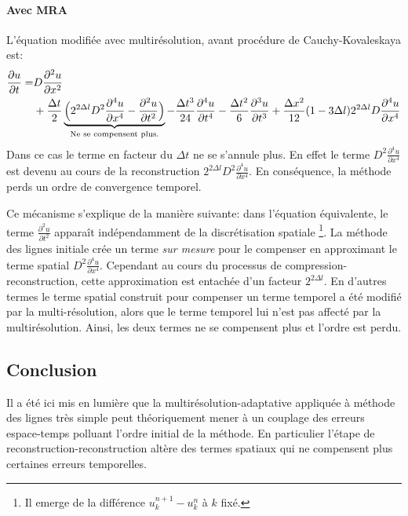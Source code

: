     \paragraph{Avec MRA}
        L'équation modifiée avec multirésolution, avant procédure de Cauchy-Kovaleskaya est:
        \begin{align}
            \frac{\partial u}{\partial  t} =&D \frac{\partial^{2} u}{\partial x^{2}}\\\notag
            &+ \frac{\Delta t}{2} \underbrace{\Bigl(2^{2 \Delta l} D^{2}           \frac{\partial^{4} u}{\partial x^{4}} -\frac{\partial^{2} u}{\partial t^{2}} \Bigr)}_{\text{Ne se compensent plus.}}
            -\frac{\Delta t^{3}}{24}                          \frac{\partial^{4} u}{\partial t^{4}} 
            - \frac{\Delta t^{2}}{6}                           \frac{\partial^{3} u}{\partial t^{3}}
            +\frac{\Delta x^{2}}{12} (1 - 3\Delta l)    2^{2 \Delta l} D \frac{\partial^{4} u}{\partial x^{4}}
        \end{align}
        Dans ce cas le terme en facteur du $\Delta t$ ne se s'annule plus. En effet le terme $D^{2}\frac{\partial^{4} u}{\partial x^{4}}$ est devenu au cours de la reconstruction
        $2^{2 \Delta l} D^{2}\frac{\partial^{4} u}{\partial x^{4}}$. En conséquence, la méthode perds un ordre de convergence temporel.\par
        Ce mécanisme s'explique de la manière suivante: dans l'équation équivalente, le terme $\frac{\partial^{2} u}{\partial t^{2}}$ apparaît indépendamment de la discrétisation spatiale
        \footnote{Il emerge de la différence $u_k^{n+1} - u_k^{n}$ à $k$ fixé.}. La méthode des lignes initiale crée un terme \textit{sur mesure} pour le compenser en approximant le terme spatial
        $D^{2}\frac{\partial^{4} u}{\partial x^{4}}$. Cependant au cours du processus de compression-reconstruction, cette approximation est entachée d'un facteur $2^{2 \Delta l}$.
        En d'autres termes le terme spatial construit pour compenser un terme temporel a été modifié par la multi-résolution, alors que le terme temporel lui n'est pas affecté par la multirésolution.
        Ainsi, les deux termes ne se compensent plus et l'ordre est perdu.
\subsection{Conclusion}
    Il a été ici mis en lumière que la multirésolution-adaptative appliquée à méthode des lignes très simple
    peut théoriquement mener à un couplage des erreurs espace-temps polluant l'ordre initial de la méthode.
    En particulier l'étape de reconstruction-reconstruction altère des termes spatiaux qui ne compensent plus certaines erreurs temporelles. 
